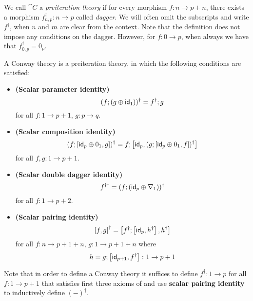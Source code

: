  We call $\cat{C}$ a \emph{preiteration theory} if for every morphism $f \colon n \to p + n$, there exists a morphism $f^\dagger_{n,p} \colon n \to p$ called \emph{dagger}. We will often omit the subscripts and write $f^\dagger$, when $n$ and $m$ are clear from the context. Note that the definition does not impose any conditions on the dagger. However, for $f \colon 0 \to p$, when always we have that $f_{0,p}^\dagger = 0_p$.
 
 
 
\begin{definition}\label{def:conway_theory}
	A Conway theory is a preiteration theory, in which the following conditions are satisfied:
	\begin{itemize}
		\item \textbf{(Scalar parameter identity)} $$(f ; (g \oplus \mathsf{id}_1))^\dagger = f^\dagger ; g$$ for all $f \colon 1 \to p + 1$, $g \colon p \to q$.
		\item \textbf{(Scalar composition identity)} 
		$$
		(f ; \left[ \mathsf{id}_p\oplus0_1, g \right])^\dagger = f ; \left[ \mathsf{id}_p,  (g ;  \left[ \mathsf{id}_p \oplus 0_1 , f\right])^\dagger\right]
		$$ for all $f,g \colon 1 \to p + 1$.
		\item \textbf{(Scalar double dagger identity)} 
		$$f^{\dagger\dagger} = (f ; (\mathsf{id}_p \oplus \nabla_1))^\dagger$$
		for all $f \colon 1 \to p + 2$.
		\item \textbf{(Scalar pairing identity)}
		$$\left[ f ,g \right]^\dagger = \left[ f^\dagger ; \left[ \mathsf{id}_p, h^\dagger \right], h^\dagger \right]$$ for all $f \colon n \to p + 1 + n $, $g \colon 1 \to p + 1 + n$ where 
		$$
		h = g ; \left[ \mathsf{id}_{p + 1}, f^\dagger\right] \colon 1 \to p + 1
		$$
	\end{itemize}
\end{definition}
\begin{remark}\label{rem:defining_dagger}
	Note that in order to define a Conway theory it suffices to define $f^\dagger \colon 1 \to p$ for all $f \colon 1 \to p + 1$ that satisfies first three axioms of  and use \textbf{scalar pairing identity} to inductively define $(-)^\dagger$.
\end{remark}

